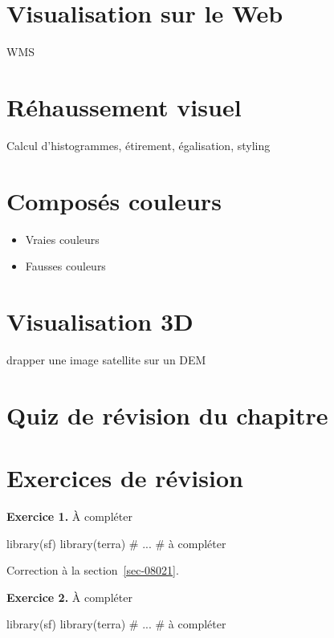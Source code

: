\documentclass[
  letterpaper,
  DIV=11,
  numbers=noendperiod]{scrreprt}
\newenvironment{Shaded}{\begin{snugshade}}{\end{snugshade}}
\newcommand{\CommentTok}[1]{\textcolor[rgb]{0.37,0.37,0.37}{#1}}
\newcommand{\NormalTok}[1]{\textcolor[rgb]{0.00,0.23,0.31}{#1}}
\begin{document}
\section{Visualisation sur le Web}\label{sec-021}

WMS

\section{Réhaussement visuel}\label{sec-022}

Calcul d'histogrammes, étirement, égalisation, styling

\section{Composés couleurs}\label{sec-023}

\begin{itemize}
\item
  Vraies couleurs
\item
  Fausses couleurs
\end{itemize}

\section{Visualisation 3D}\label{sec-024}

drapper une image satellite sur un DEM

\section{Quiz de révision du chapitre}\label{sec-025}

\section{Exercices de révision}\label{sec-027}

\textbf{Exercice 1.} À compléter

\begin{Shaded}
\begin{Highlighting}[]
\NormalTok{library(sf)}
\NormalTok{library(terra)}
\CommentTok{\# ...}
\CommentTok{\# à compléter}
\end{Highlighting}
\end{Shaded}

Correction à la section~\ref{sec-08021}.

\textbf{Exercice 2.} À compléter

\begin{Shaded}
\begin{Highlighting}[]
\NormalTok{library(sf)}
\NormalTok{library(terra)}
\CommentTok{\# ...}
\CommentTok{\# à compléter}
\end{Highlighting}
\end{Shaded}
\end{document}
